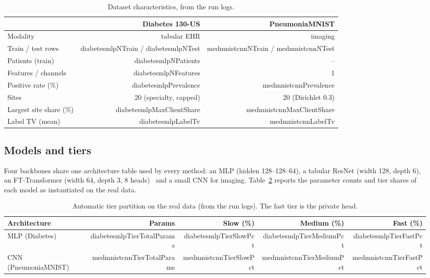 \begin{table}[t]
\caption{Dataset characteristics, from the run logs.}
\label{tab:data}
\centering\small
\begin{tabular}{lrr}
\toprule
 & Diabetes 130-US & PneumoniaMNIST\\
\midrule
Modality & tabular EHR & imaging\\
Train / test rows & \num{diabetesmlpNTrain} / \num{diabetesmlpNTest} & \num{medmnistcnnNTrain} / \num{medmnistcnnNTest}\\
Patients (train) & \num{diabetesmlpNPatients} & --\\
Features / channels & \num{diabetesmlpNFeatures} & 1\\
Positive rate (\%) & \num{diabetesmlpPrevalence} & \num{medmnistcnnPrevalence}\\
Sites & 20 (specialty, capped) & 20 (Dirichlet 0.3)\\
Largest site share (\%) & \num{diabetesmlpMaxClientShare} & \num{medmnistcnnMaxClientShare}\\
Label TV (mean) & \num{diabetesmlpLabelTv} & \num{medmnistcnnLabelTv}\\
\bottomrule
\end{tabular}
\end{table}

\subsection{Models and tiers}
Four backbones share one architecture table used by every method: an MLP (hidden 128--128--64), a tabular ResNet (width 128, depth 6), an FT-Transformer (width 64, depth 3, 8 heads)~\cite{gorishniy2021} and a small CNN for imaging. Table~\ref{tab:tiers} reports the parameter counts and tier shares of each model as instantiated on the real data.

\begin{table}[t]
\caption{Automatic tier partition on the real data (from the run logs). The fast tier is the private head.}
\label{tab:tiers}
\centering\small
\begin{tabular}{lrrrr}
\toprule
Architecture & Params & Slow (\%) & Medium (\%) & Fast (\%)\\
\midrule
MLP (Diabetes) & \num{diabetesmlpTierTotalParams} & \num{diabetesmlpTierSlowPct} & \num{diabetesmlpTierMediumPct} & \num{diabetesmlpTierFastPct}\\
CNN (PneumoniaMNIST) & \num{medmnistcnnTierTotalParams} & \num{medmnistcnnTierSlowPct} & \num{medmnistcnnTierMediumPct} & \num{medmnistcnnTierFastPct}\\
\bottomrule
\end{tabular}
\end{table}

